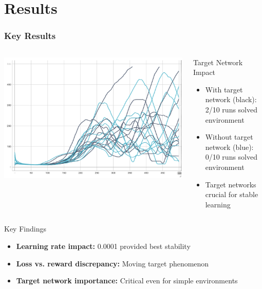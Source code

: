 \documentclass[
    9pt,
    aspectratio=169,
]{beamer}
\begin{document}
\section{Results}

\begin{frame}
\frametitle{Key Results}
\begin{columns}
\includegraphics[width=\textwidth]{media/target_ablation.png}
\begin{block}{Target Network Impact}
    \begin{itemize}
        \item With target network (black): 2/10 runs solved environment
        \item Without target network (blue): 0/10 runs solved environment
        \item Target networks crucial for stable learning
    \end{itemize}
\end{block}
\end{columns}

\begin{block}{Key Findings}
    \begin{itemize}
        \item \textbf{Learning rate impact:} 0.0001 provided best stability
        \item \textbf{Loss vs. reward discrepancy:} Moving target phenomenon
        \item \textbf{Target network importance:} Critical even for simple environments
    \end{itemize}
\end{block}
\end{frame}
\end{document}
